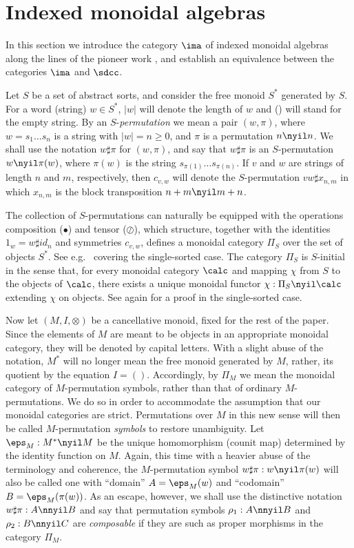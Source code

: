 \documentclass{eptcs}
\begin{document}
\section{Indexed monoidal algebras}
In this section we introduce the category $\ima $ of indexed monoidal algebras
along the lines of the pioneer work \cite{hel}, and establish 
an equivalence between the categories $\ima $ and $\sdcc $.

Let $S$ be a set of abstract sorts, and consider the free monoid $S^*$
generated by $S$.  For a word (string) $w\in S^*$, $|w|$ will denote the
length of $w$ and () will stand for the empty string. By an 
$S$-{\em permutation\/} we mean a pair $(w,\pi )$, where $w=s_1\ldots s_n$ is
a string with $|w|=n\geq 0$, and $\pi $ is a permutation $n\nyil n$. We shall
use the notation $w\sharp \pi $ for $(w,\pi)$, and say that $w\sharp \pi $ is an
$S$-permutation $w\nyil \pi (w)$, where $\pi (w)$ is the string $s_{\pi
(1)}\ldots  s_{\pi (n)}$.  If $v$ and $w$ are strings of length $n$ and $m$,
respectively, then  $c_{v,w}$ will denote the $S$-permutation $vw\sharp
x_{n,m}$ in which $x_{n,m}$ is the block transposition $n+m\nyil m+n$.

The collection of $S$-permutations can naturally be equipped with the operations
composition ($\bullet $) and tensor ($\oslash $), which structure, together with the 
identities $1_w=w\sharp id _n$ and symmetries $c_{v,w}$, defines a monoidal 
category $\Pi _S$ over the set of
objects $S^*$. See e.g.\ \cite [Definition~1]{acta} covering the single-sorted
case. The category $\Pi_S$ is $S$-initial in the sense that, for every monoidal category
$\calc $ and mapping $\chi $ from $S$ to the objects of $\calc $, there exists a unique monoidal
functor $\chi :\Pi_S\nyil \calc $ extending $\chi $ on objects. See again \cite
[Corollary 1]{acta}  for a proof in the single-sorted case. 

Now let $(M,I,\otimes)$ be a cancellative monoid, fixed for the rest of the paper.
Since the elements of $M$ are meant to be objects in an appropriate monoidal
category, they will be denoted by capital letters. With a slight abuse of the
notation, $M^*$ will no longer mean the free monoid generated by $M$, rather, its
quotient by the equation $I=()$. Accordingly, by $\Pi _M$ we mean the monoidal
category of $M$-permutation symbols, rather than that of ordinary $M$-permutations.
We do so in order to accommodate the assumption that our monoidal categories
are strict. Permutations over $M$ in this new sense will then be called 
$M$-permutation {\em symbols\/} to restore unambiguity. Let $\eps _M:M^*\nyil M$
be the unique homomorphism (counit map) determined by the identity function on $M$.
Again, this time with a heavier abuse of the terminology and coherence, the $M$-permutation
symbol $w\sharp \pi :w\nyil \pi (w)$ will also be called one with ``domain'' $A=\eps _M(w)$
and ``codomain'' $B=\eps _M(\pi (w))$. As an escape, however, we shall use the distinctive
notation $w\sharp \pi :A\nnyil B$ and say that permutation symbols $\rho _1:A\nnyil B$
and $\rho _2:B\nnyil C$ are {\em composable\/} if they are such as proper morphisms
in the category $\Pi_M$. 
\end{document}
